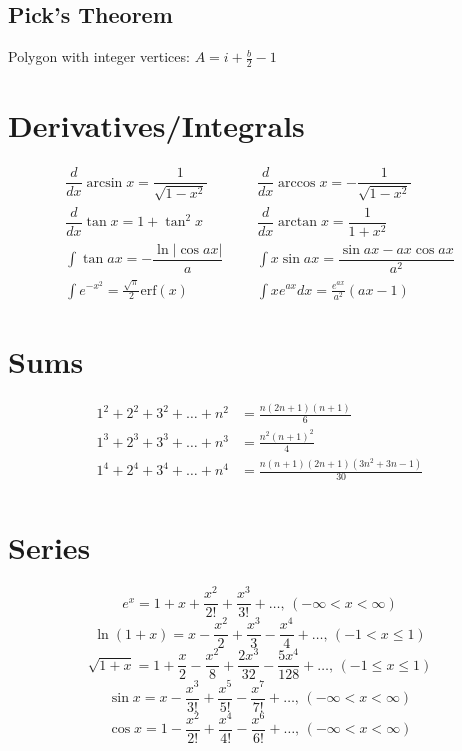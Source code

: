 \subsection{Pick's Theorem}
Polygon with integer vertices: $A=i+\frac{b}{2}-1$

\section{Derivatives/Integrals}
\begin{align*}
	\dfrac{d}{dx}\arcsin x = \dfrac{1}{\sqrt{1-x^2}} &&& \dfrac{d}{dx}\arccos x = -\dfrac{1}{\sqrt{1-x^2}} \\
	\dfrac{d}{dx}\tan x = 1+\tan^2 x &&& \dfrac{d}{dx}\arctan x = \dfrac{1}{1+x^2} \\
	\int\tan ax = -\dfrac{\ln|\cos ax|}{a} &&& \int x\sin ax = \dfrac{\sin ax-ax \cos ax}{a^2} \\
	\int e^{-x^2} = \frac{\sqrt \pi}{2} \text{erf}(x) &&& \int xe^{ax}dx = \frac{e^{ax}}{a^2}(ax-1)
\end{align*}


\section{Sums}
\begin{align*}
	1^2 + 2^2 + 3^2 + \dots + n^2 &= \frac{n(2n+1)(n+1)}{6} \\
	1^3 + 2^3 + 3^3 + \dots + n^3 &= \frac{n^2(n+1)^2}{4} \\
	1^4 + 2^4 + 3^4 + \dots + n^4 &= \frac{n(n+1)(2n+1)(3n^2 + 3n - 1)}{30} \\
\end{align*}

\section{Series}
$$e^x = 1+x+\frac{x^2}{2!}+\frac{x^3}{3!}+\dots,\,(-\infty<x<\infty)$$
$$\ln(1+x) = x-\frac{x^2}{2}+\frac{x^3}{3}-\frac{x^4}{4}+\dots,\,(-1<x\leq1)$$
$$\sqrt{1+x} = 1+\frac{x}{2}-\frac{x^2}{8}+\frac{2x^3}{32}-\frac{5x^4}{128}+\dots,\,(-1\leq x\leq1)$$
$$\sin x = x-\frac{x^3}{3!}+\frac{x^5}{5!}-\frac{x^7}{7!}+\dots,\,(-\infty<x<\infty)$$
$$\cos x = 1-\frac{x^2}{2!}+\frac{x^4}{4!}-\frac{x^6}{6!}+\dots,\,(-\infty<x<\infty)$$

